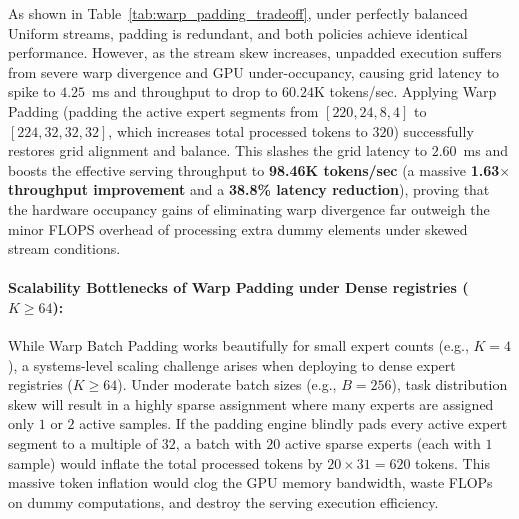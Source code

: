 \documentclass{article}
\theoremstyle{plain}
\theoremstyle{definition}
\theoremstyle{remark}
\begin{document}
\begin{enumerate}
    As shown in Table~\ref{tab:warp_padding_tradeoff}, under perfectly balanced Uniform streams, padding is redundant, and both policies achieve identical performance. However, as the stream skew increases, unpadded execution suffers from severe warp divergence and GPU under-occupancy, causing grid latency to spike to $4.25$~ms and throughput to drop to $60.24$K tokens/sec. Applying Warp Padding (padding the active expert segments from $[220, 24, 8, 4]$ to $[224, 32, 32, 32]$, which increases total processed tokens to $320$) successfully restores grid alignment and balance. This slashes the grid latency to $2.60$~ms and boosts the effective serving throughput to \textbf{98.46K tokens/sec} (a massive \textbf{1.63$\times$ throughput improvement} and a \textbf{38.8\% latency reduction}), proving that the hardware occupancy gains of eliminating warp divergence far outweigh the minor FLOPS overhead of processing extra dummy elements under skewed stream conditions.

    \paragraph{Scalability Bottlenecks of Warp Padding under Dense registries ($K \ge 64$):}
    While Warp Batch Padding works beautifully for small expert counts (e.g., $K=4$), a systems-level scaling challenge arises when deploying to dense expert registries ($K \ge 64$). Under moderate batch sizes (e.g., $B=256$), task distribution skew will result in a highly sparse assignment where many experts are assigned only $1$ or $2$ active samples. If the padding engine blindly pads every active expert segment to a multiple of $32$, a batch with $20$ active sparse experts (each with $1$ sample) would inflate the total processed tokens by $20 \times 31 = 620$ tokens. This massive token inflation would clog the GPU memory bandwidth, waste FLOPs on dummy computations, and destroy the serving execution efficiency.


\end{enumerate}
\end{document}
